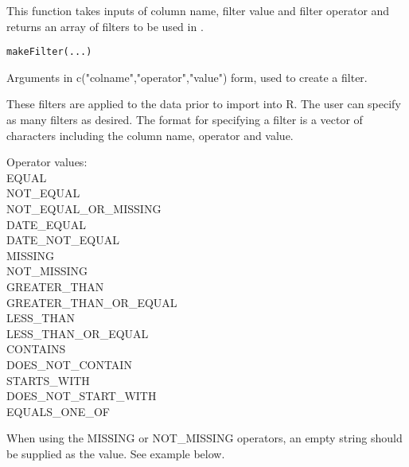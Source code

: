 \documentclass{book}
\begin{document}
\begin{Description}\relax
This function takes inputs of column name, filter value and filter operator and 
returns an array of filters to be used in .
\end{Description}
\begin{Usage}
\begin{verbatim}
makeFilter(...)
\end{verbatim}
\end{Usage}
\begin{Arguments}
\begin{ldescription}
\item[\code{...}] Arguments in c("colname","operator","value") form, used to create a filter.
\end{ldescription}
\end{Arguments}
\begin{Details}\relax
These filters are applied to the data prior to import into R. The user can specify as many 
filters as desired. The format for specifying a filter is a vector of characters including
the column name, operator and value.

Operator values:\\
EQUAL\\
NOT\_EQUAL\\ 
NOT\_EQUAL\_OR\_MISSING\\
DATE\_EQUAL\\
DATE\_NOT\_EQUAL\\
MISSING\\
NOT\_MISSING\\
GREATER\_THAN\\
GREATER\_THAN\_OR\_EQUAL\\
LESS\_THAN\\
LESS\_THAN\_OR\_EQUAL\\
CONTAINS\\
DOES\_NOT\_CONTAIN\\
STARTS\_WITH\\
DOES\_NOT\_START\_WITH\\
EQUALS\_ONE\_OF 

When using the MISSING or NOT\_MISSING operators, an empty string should be supplied as the value.
See example below.
\end{Details}
\end{document}
